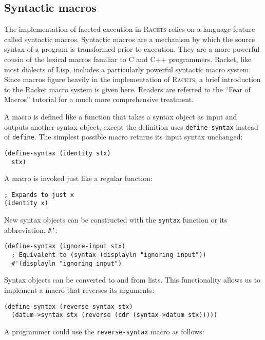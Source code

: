 \documentclass{article}
\begin{document}
\subsection{Syntactic macros}
The implementation of faceted execution in \textsc{Racets} relies on a language feature called syntactic macros. Syntactic macros are a mechanism by which the source syntax of a program is transformed prior to execution. They are a more powerful cousin of the lexical macros familiar to C and C++ programmers. Racket, like most dialects of Lisp, includes a particularly powerful syntactic macro system. Since macros figure heavily in the implementation of \textsc{Racets}, a brief introduction to the Racket macro system is given here. Readers are referred to the ``Fear of Macros'' tutorial \cite{fear-of-macros} for a much more comprehensive treatment.

A macro is defined like a function that takes a syntax object as input and outputs another syntax object, except the definition uses \texttt{define-syntax} instead of \texttt{define}. The simplest possible macro returns its input syntax unchanged:

\begin{lstlisting}
(define-syntax (identity stx)
  stx)
\end{lstlisting}

A macro is invoked just like a regular function:

\begin{lstlisting}
; Expands to just x
(identity x)
\end{lstlisting}

New syntax objects can be constructed with the \texttt{syntax} function or its abbreviation, \texttt{\#'}:

\begin{lstlisting}
(define-syntax (ignore-input stx)
  ; Equivalent to (syntax (displayln "ignoring input"))
  #'(displayln "ignoring input")
\end{lstlisting}

Syntax objects can be converted to and from lists. This functionality allows us to implement a macro that reverses its arguments:

\begin{lstlisting}
(define-syntax (reverse-syntax stx)
  (datum->syntax stx (reverse (cdr (syntax->datum stx)))))
\end{lstlisting}

A programmer could use the \texttt{reverse-syntax} macro as follows:
\end{document}
